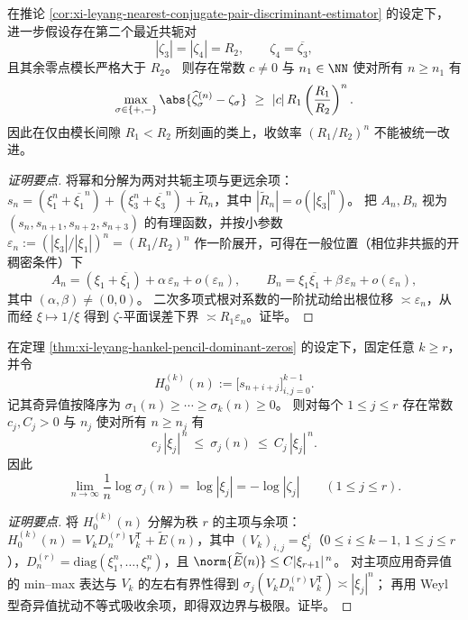 \begin{proposition}[指数收敛率的一般锐性]\label{prop:xi-leyang-exponential-rate-sharpness}
在推论 \ref{cor:xi-leyang-nearest-conjugate-pair-discriminant-estimator} 的设定下，进一步假设存在第二个最近共轭对
\[
|\zeta_3|=|\zeta_4|=R_2,\qquad \zeta_4=\overline{\zeta_3},
\]
且其余零点模长严格大于 \(R_2\)。
则存在常数 \(c\neq 0\) 与 \(n_1\in\NN\) 使对所有 \(n\ge n_1\) 有
\[
\max_{\sigma\in\{+,-\}}\abs{\widehat\zeta_\sigma^{(n)}-\zeta_\sigma}
\ \ge\ |c|\,R_1\left(\frac{R_1}{R_2}\right)^{n}.
\]
因此在仅由模长间隙 \(R_1<R_2\) 所刻画的类上，收敛率 \((R_1/R_2)^n\) 不能被统一改进。
\end{proposition}
\begin{proof}[证明要点]
将幂和分解为两对共轭主项与更远余项：
\(
s_n=(\xi_1^n+\overline{\xi_1}^n)+(\xi_3^n+\overline{\xi_3}^n)+\widetilde R_n
\)，其中 \(|\widetilde R_n|=o(|\xi_3|^n)\)。
把 \(A_n,B_n\) 视为 \((s_n,s_{n+1},s_{n+2},s_{n+3})\) 的有理函数，并按小参数
\(
\varepsilon_n:=(|\xi_3|/|\xi_1|)^n=(R_1/R_2)^n
\)
作一阶展开，可得在一般位置（相位非共振的开稠密条件）下
\[
A_n=(\xi_1+\overline{\xi_1})+\alpha\,\varepsilon_n+o(\varepsilon_n),\qquad
B_n=\xi_1\overline{\xi_1}+\beta\,\varepsilon_n+o(\varepsilon_n),
\]
其中 \((\alpha,\beta)\neq (0,0)\)。
二次多项式根对系数的一阶扰动给出根位移 \(\asymp \varepsilon_n\)，从而经 \(\xi\mapsto 1/\xi\) 得到 \(\zeta\)-平面误差下界 \(\asymp R_1\varepsilon_n\)。证毕。
\end{proof}

\begin{theorem}\label{thm:xi-leyang-hankel-singular-slope-detects-moduli}
在定理 \ref{thm:xi-leyang-hankel-pencil-dominant-zeros} 的设定下，固定任意 \(k\ge r\)，并令
\[
H_0^{(k)}(n):=\bigl[s_{n+i+j}\bigr]_{i,j=0}^{k-1}.
\]
记其奇异值按降序为 \(\sigma_1(n)\ge\cdots\ge\sigma_k(n)\ge 0\)。
则对每个 \(1\le j\le r\) 存在常数 \(c_j,C_j>0\) 与 \(n_j\) 使对所有 \(n\ge n_j\) 有
\[
c_j\,|\xi_j|^{\,n}\ \le\ \sigma_j(n)\ \le\ C_j\,|\xi_j|^{\,n}.
\]
因此
\[
\lim_{n\to\infty}\frac{1}{n}\log\sigma_j(n)=\log|\xi_j|=-\log|\zeta_j|\qquad(1\le j\le r).
\]
\end{theorem}
\begin{proof}[证明要点]
将 \(H_0^{(k)}(n)\) 分解为秩 \(r\) 的主项与余项：
\(
H_0^{(k)}(n)=V_k D_n^{(r)} V_k^{\mathsf T}+\widetilde E(n)
\)，其中 \((V_k)_{i,j}=\xi_j^i\)（\(0\le i\le k-1,\,1\le j\le r\)），\(D_n^{(r)}=\mathrm{diag}(\xi_1^n,\dots,\xi_r^n)\)，且 \(\norm{\widetilde E(n)}\le C|\xi_{r+1}|^{\,n}\)。
对主项应用奇异值的 min--max 表达与 \(V_k\) 的左右有界性得到 \(\sigma_j(V_k D_n^{(r)} V_k^{\mathsf T})\asymp |\xi_j|^n\)；
再用 Weyl 型奇异值扰动不等式吸收余项，即得双边界与极限。证毕。
\end{proof}

